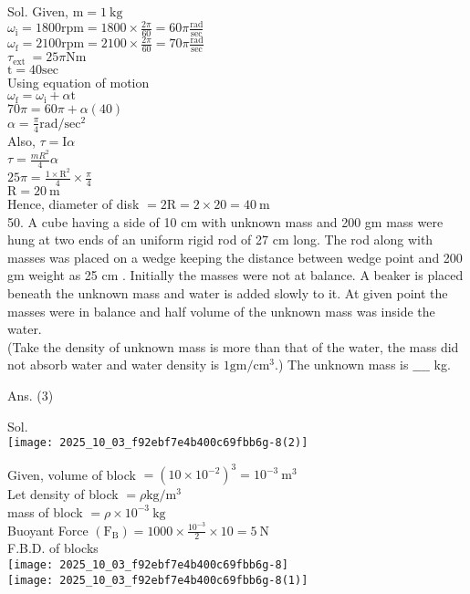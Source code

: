 \documentclass[10pt]{article}
\begin{document}
Sol. Given, \(\mathrm{m}=1 \mathrm{~kg}\)\\
\(\omega_{\mathrm{i}}=1800 \mathrm{rpm}=1800 \times \frac{2 \pi}{60}=60 \pi \frac{\mathrm{rad}}{\mathrm{sec}}\)\\
\(\omega_{\mathrm{f}}=2100 \mathrm{rpm}=2100 \times \frac{2 \pi}{60}=70 \pi \frac{\mathrm{rad}}{\mathrm{sec}}\)\\
\(\tau_{\text {ext }}=25 \pi \mathrm{Nm}\)\\
\(\mathrm{t}=40 \mathrm{sec}\)\\
Using equation of motion\\
\(\omega_{\mathrm{f}}=\omega_{\mathrm{i}}+\alpha \mathrm{t}\)\\
\(70 \pi=60 \pi+\alpha(40)\)\\
\(\alpha=\frac{\pi}{4} \mathrm{rad} / \mathrm{sec}^{2}\)\\
Also, \(\tau=\mathrm{I} \alpha\)\\
\(\tau=\frac{m R^{2}}{4} \alpha\)\\
\(25 \pi=\frac{1 \times \mathrm{R}^{2}}{4} \times \frac{\pi}{4}\)\\
\(\mathrm{R}=20 \mathrm{~m}\)\\
Hence, diameter of disk \(=2 \mathrm{R}=2 \times 20=40 \mathrm{~m}\)\\
50. A cube having a side of 10 cm with unknown mass and 200 gm mass were hung at two ends of an uniform rigid rod of 27 cm long. The rod along with masses was placed on a wedge keeping the distance between wedge point and 200 gm weight as 25 cm . Initially the masses were not at balance. A beaker is placed beneath the unknown mass and water is added slowly to it. At given point the masses were in balance and half volume of the unknown mass was inside the water.\\
(Take the density of unknown mass is more than that of the water, the mass did not absorb water and water density is \(1 \mathrm{gm} / \mathrm{cm}^{3}\).) The unknown mass is \(\_\_\_\_\) kg.

Ans. (3)

Sol.\\
\texttt{[image: 2025\_10\_03\_f92ebf7e4b400c69fbb6g-8(2)]}

Given, volume of block \(=\left(10 \times 10^{-2}\right)^{3}=10^{-3} \mathrm{~m}^{3}\)\\
Let density of block \(=\rho \mathrm{kg} / \mathrm{m}^{3}\)\\
mass of block \(=\rho \times 10^{-3} \mathrm{~kg}\)\\
Buoyant Force \(\left(\mathrm{F}_{\mathrm{B}}\right)=1000 \times \frac{10^{-3}}{2} \times 10=5 \mathrm{~N}\)\\
F.B.D. of blocks\\
\texttt{[image: 2025\_10\_03\_f92ebf7e4b400c69fbb6g-8]}\\
\texttt{[image: 2025\_10\_03\_f92ebf7e4b400c69fbb6g-8(1)]}
\end{document}
